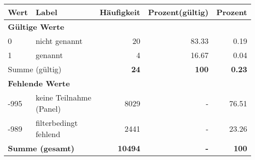      \begin{longtable}{lXrrr}
     \toprule
     \textbf{Wert} & \textbf{Label} & \textbf{Häufigkeit} & \textbf{Prozent(gültig)} & \textbf{Prozent} \\
     \endhead
     \midrule
     \multicolumn{5}{l}{\textbf{Gültige Werte}}\\

     0 &
     \multicolumn{1}{X}{ nicht genannt   } &


       \num{20} &
       \num[round-mode=places,round-precision=2]{83,33} &
         \num[round-mode=places,round-precision=2]{0,19} \\

     1 &
     \multicolumn{1}{X}{ genannt   } &


       \num{4} &
       \num[round-mode=places,round-precision=2]{16,67} &
         \num[round-mode=places,round-precision=2]{0,04} \\
     \midrule
     \multicolumn{2}{l}{Summe (gültig)} &
       \textbf{\num{24}} &
     \textbf{100} &
       \textbf{\num[round-mode=places,round-precision=2]{0,23}} \\
     \multicolumn{5}{l}{\textbf{Fehlende Werte}}\\
       -995 &
       keine Teilnahme (Panel) &
         \num{8029} &
        - &
         \num[round-mode=places,round-precision=2]{76,51} \\
       -989 &
       filterbedingt fehlend &
         \num{2441} &
        - &
         \num[round-mode=places,round-precision=2]{23,26} \\
     \midrule
     \multicolumn{2}{l}{\textbf{Summe (gesamt)}} &
          \textbf{\num{10494}} &
        \textbf{-} &
        \textbf{100} \\
     \bottomrule
     \end{longtable}
     
